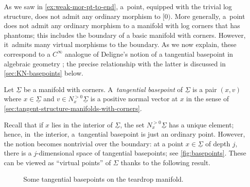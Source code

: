 \documentclass[JEP,XML,SOM,Unicode,NoFloatCountersInSection,published]{cedram}
\theoremstyle{definition}
\theoremstyle{remark}
\let\defn\emph
\newcommand{\Sig}{\Sigma}
\newcommand{\uSig}{\underline{\Sigma}}
\begin{document}
As we saw in \autoref{ex:weak-mor-pt-to-end}, a~point, equipped with the trivial log structure, does not admit any ordinary morphism to $[0)$. More generally, a~point does not admit any ordinary morphism to a manifold with log corners that has phantoms; this includes the boundary of a basic manifold with corners. However, it~admits many virtual morphisms to the boundary. As we now explain, these correspond to a $C^\infty$ analogue of Deligne's notion of a tangential basepoint in algebraic geometry \cite[\S 15]{Deligne1989}; the precise relationship with the latter is discussed in \autoref{sec:KN-basepoints} below.

\begin{definition}
Let $\uSig$ be a manifold with corners. A~\defn{tangential basepoint} of $\uSig$ is a pair $(x,v)$ where $x\in\uSig$ and $v\in N_x^{>0}\uSig$ is a positive normal vector at $x$ in the sense of \autoref{sec:tangent-structure-manifolds-with-corners}.
\end{definition}
Recall that if $x$ lies in the interior of $\uSig$, the set $N_x^{>0}\uSig$ has a unique element; hence, in~the interior, a~tangential basepoint is just an ordinary point. However, the notion becomes nontrivial over the boundary: at a point $x \in \uSig$ of depth $j$, there is a $j$-dimensional space of tangential basepoints; see \autoref{fig:basepoints}.
These can be viewed as ``virtual points'' of $\Sig$ thanks to the following result.

\begin{figure}
\caption{Some tangential basepoints on the teardrop manifold.}\label{fig:basepoints}
\end{figure}
\end{document}
